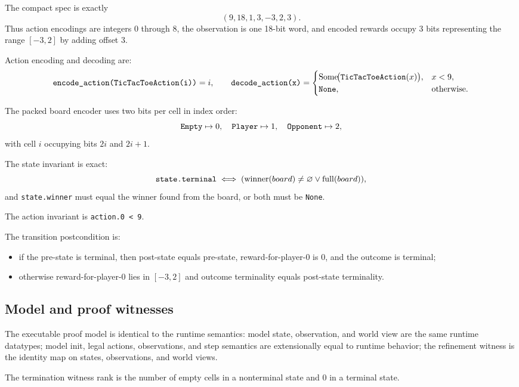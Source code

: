 \documentclass[11pt]{article}
\newcommand{\code}[1]{\ifmmode\text{\texttt{#1}}\else\texttt{#1}\fi}
\begin{document}
The compact spec is exactly
\[
(9,18,1,3,-3,2,3).
\]
Thus action encodings are integers $0$ through $8$, the observation is one 18-bit word, and encoded rewards occupy 3 bits representing the range $[-3,2]$ by adding offset $3$.

Action encoding and decoding are:
\[
\code{encode\_action(TicTacToeAction(i))}=i,
\qquad
\code{decode\_action(x)}=\begin{cases}
\operatorname{Some}\!\bigl(\code{TicTacToeAction}(x)\bigr), & x<9,\\
\code{None}, & \text{otherwise}.
\end{cases}
\]

The packed board encoder uses two bits per cell in index order:
\[
\code{Empty}\mapsto 0,\quad \code{Player}\mapsto 1,\quad \code{Opponent}\mapsto 2,
\]
with cell $i$ occupying bits $2i$ and $2i+1$.

The state invariant is exact:
\[
\code{state.terminal} \iff (\operatorname{winner}(board)\neq\varnothing \lor \operatorname{full}(board)),
\]
and \code{state.winner} must equal the winner found from the board, or both must be \code{None}.

The action invariant is \code{action.0 < 9}.

The transition postcondition is:
\begin{itemize}
  \item if the pre-state is terminal, then post-state equals pre-state, reward-for-player-$0$ is $0$, and the outcome is terminal;
  \item otherwise reward-for-player-$0$ lies in $[-3,2]$ and outcome terminality equals post-state terminality.
\end{itemize}

\subsection{Model and proof witnesses}

The executable proof model is identical to the runtime semantics: model state, observation, and world view are the same runtime datatypes; model init, legal actions, observations, and step semantics are extensionally equal to runtime behavior; the refinement witness is the identity map on states, observations, and world views.

The termination witness rank is the number of empty cells in a nonterminal state and $0$ in a terminal state.
\end{document}

